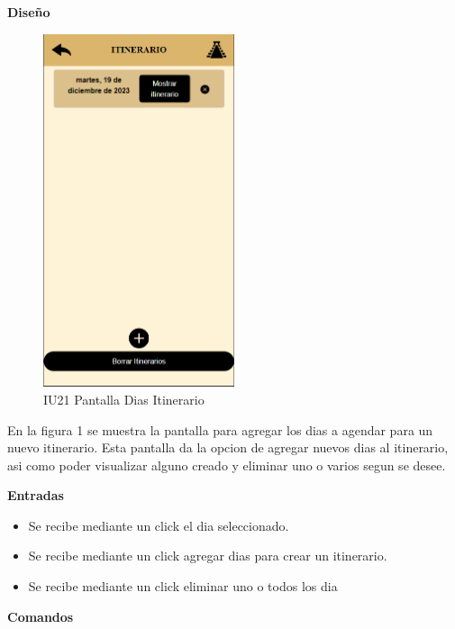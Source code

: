 \textbf{Diseño}\\
\begin{figure}[htbp]
    \centering 
    \includegraphics[width=0.5\textwidth]{entregable final/pantallasSistema/IU21 Pantalla Dias Itinerario.png}
    \caption{IU21 Pantalla Dias Itinerario} %
    \label{fig:Pantalla de itinerarios} %
\end{figure}

En la figura 1 se muestra la pantalla para agregar los dias a agendar para un nuevo itinerario. Esta pantalla da la opcion de agregar nuevos dias al itinerario, asi como poder visualizar alguno creado y eliminar uno o varios segun se desee.

\textbf{Entradas}\\
\begin{itemize}
    \item Se recibe mediante un click el dia seleccionado.

     \item Se recibe mediante un click agregar dias para crear un itinerario.\\
 \item Se recibe mediante un click eliminar uno o todos los dia \\
\end{itemize}

\textbf{Comandos}\\

